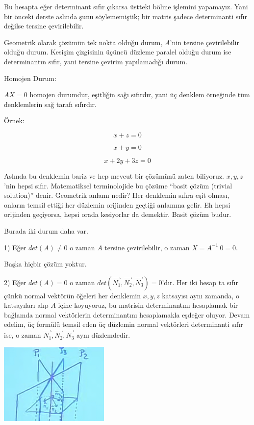 \documentclass[12pt,fleqn]{article}\usepackage{../../common}
\begin{document}
Bu hesapta eğer determinant sıfır çıkarsa üstteki bölme işlemini yapamayız. Yani
bir önceki derste aslında şunu söylememiştik; bir matris şadece determinanti
sıfır değilse tersine çevirilebilir.

Geometrik olarak çözümün tek nokta olduğu durum, $A$'nin tersine çevirilebilir
olduğu durum. Kesişim çizgisinin üçüncü düzleme paralel olduğu durum ise
determinantın sıfır, yani tersine çevirim yapılamadığı durum.

Homojen Durum:

$AX = 0$ homojen durumdur, eşitliğin sağı sıfırdır, yani üç denklem
örneğinde tüm denklemlerin sağ tarafı sıfırdır. 

Örnek:

$$ x + z = 0 $$

$$ x + y = 0 $$

$$ x + 2y + 3z = 0 $$

Aslında bu denklemin bariz ve hep mevcut bir çözümünü zaten
biliyoruz. $x,y,z$'nin hepsi sıfır. Matematiksel terminolojide bu çözüme ``basit
çözüm (trivial solution)'' denir. Geometrik anlamı nedir? Her denklemin sıfıra
eşit olması, onların temsil ettiği her düzlemin orijinden geçtiği anlamına
gelir. Eh hepsi orijinden geçiyorsa, hepsi orada kesiyorlar da demektir. Basit
çözüm budur.

Burada iki durum daha var. 

1) Eğer $det(A) \ne 0$ o zaman $A$ tersine çevirilebilir, o zaman $X =
A^{-1} \ 0 = 0$. 

Başka hiçbir çözüm yoktur.

2) Eğer $det(A) = 0$ o zaman $det(\vec{N_1},\vec{N_2},\vec{N_3}) = 0$'dır. Her
iki hesap ta sıfır çünkü normal vektörün öğeleri her denklemin $x,y,z$ katsayısı
aynı zamanda, o katsayıları alıp $A$ içine koyuyoruz, bu matrisin determinantını
hesaplamak bir bağlamda normal vektörlerin determinantını hesaplamakla eşdeğer
oluyor. Devam edelim, üç formülü temsil eden üç düzlemin normal vektörleri
determinanti sıfır ise, o zaman $\vec{N_1},\vec{N_2},\vec{N_3}$ aynı
düzlemdedir.

\includegraphics[height=4cm]{4_5.png}
\end{document}
